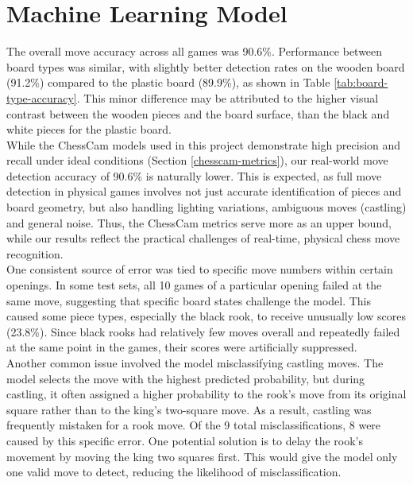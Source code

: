 \section{Machine Learning Model}

The overall move accuracy across all games was 90.6\%. Performance between board types was similar, with slightly better detection rates on the wooden board (91.2\%) compared to the plastic board (89.9\%), as shown in Table \ref{tab:board-type-accuracy}. This minor difference may be attributed to the higher visual contrast between the wooden pieces and the board surface, than the black and white pieces for the plastic board. \\

While the ChessCam models used in this project demonstrate high precision and recall under ideal conditions (Section \ref{chesscam-metrics}), our real-world move detection accuracy of 90.6\% is naturally lower. This is expected, as full move detection in physical games involves not just accurate identification of pieces and board geometry, but also handling lighting variations, ambiguous moves (castling) and general noise. Thus, the ChessCam metrics serve more as an upper bound, while our results reflect the practical challenges of real-time, physical chess move recognition. \\

One consistent source of error was tied to specific move numbers within certain openings. In some test sets, all 10 games of a particular opening failed at the same move, suggesting that specific board states challenge the model. This caused some piece types, especially the black rook, to receive unusually low scores (23.8\%). Since black rooks had relatively few moves overall and repeatedly failed at the same point in the games, their scores were artificially suppressed. \\

Another common issue involved the model misclassifying castling moves. The model selects the move with the highest predicted probability, but during castling, it often assigned a higher probability to the rook’s move from its original square rather than to the king’s two-square move. As a result, castling was frequently mistaken for a rook move. Of the 9 total misclassifications, 8 were caused by this specific error. One potential solution is to delay the rook’s movement by moving the king two squares first. This would give the model only one valid move to detect, reducing the likelihood of misclassification. \\

